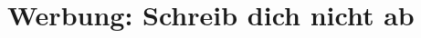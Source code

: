\newpage
\section{Werbung: Schreib dich nicht ab}
\label{sec:schreibdichnichtab}
\charaktere{-}
\setting{-}
\sound{-}
\licht{-}
\requisiten{-}
